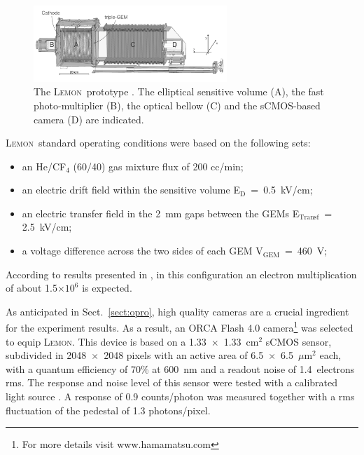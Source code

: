 \documentclass[physics,article,submit,moreauthors,pdftex]{Definitions/mdpi}
\newcommand{\lemon}{{\textsc{Lemon}}\xspace}
\newcommand{\Ed}  {E$_{\mathrm{D}}$\xspace}
\newcommand{\Et}  {E$_{\mathrm{Transf}}$\xspace}
\newcommand{\Vg}  {V$_{\mathrm{GEM}}$\xspace}
\begin{document}
\begin{figure}[t!]
\centering
\includegraphics[width=0.65\textwidth]{Fig2-lemon.png}
\caption{The \lemon\ prototype \cite{bib:Antochi_2021}. The elliptical sensitive volume (A), the fast photo-multiplier (B), the optical bellow (C) and the sCMOS-based camera (D) are indicated.}  
\label{fig:lemon}
\end{figure}

\lemon\ standard operating conditions were based on the following sets: 
\begin{itemize}
    \item an He/CF$_4$ (60/40) gas mixture flux of 200 cc/min;
    \item an electric drift field within the sensitive volume \Ed~=~0.5~kV/cm;
    \item an electric transfer field in the 2~mm gaps between the GEMs \Et~= 2.5~kV/cm;
    \item a voltage difference across the two sides of each GEM \Vg~=~460~V;
\end{itemize}

According to results presented in \cite{bib:roby}, in this configuration an electron multiplication of about 1.5$\times 10^6$ is expected.


As anticipated in Sect.~\ref{sect:opro}, high quality cameras are a crucial ingredient for the experiment results. As a result, an ORCA Flash 4.0 camera\footnote{For more details visit www.hamamatsu.com} was selected to equip \lemon. This device is based on a 1.33~$\times$~1.33~cm$^2$  sCMOS sensor, subdivided in 2048~$\times$~2048 pixels with an active area of 6.5~$\times$~6.5~$\mu$m$^2$ each, with a quantum efficiency of 70\% at 600~nm and a readout noise of 1.4~electrons rms. The response and noise level of this sensor were tested with a calibrated light source \cite{bib:jinst_orange1}. A response of 0.9 counts/photon was measured together with a rms fluctuation of the pedestal of 1.3 photons/pixel. 
 
\end{document}
